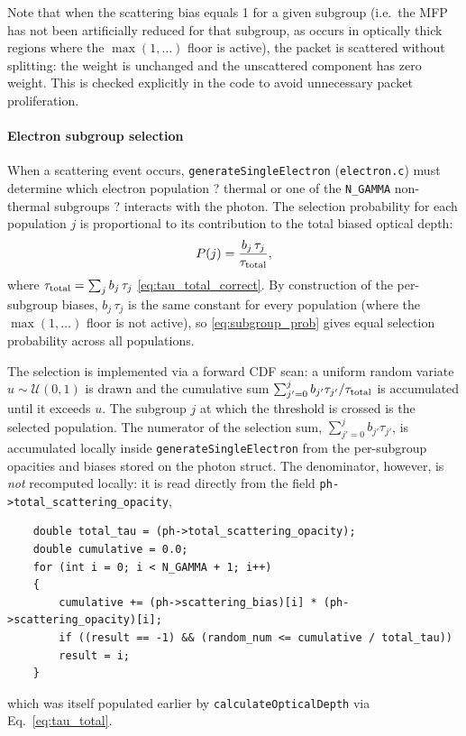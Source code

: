 \documentclass[12pt,a4paper]{article}
\newcommand{\code}[1]{\texttt{#1}}
\begin{document}
Note that when the scattering bias equals 1 for a given subgroup (i.e.\
the MFP has not been artificially reduced for that subgroup, as occurs in
optically thick regions where the $\max(1,\ldots)$ floor is active), the
packet is scattered without splitting: the weight is unchanged and the
unscattered component has zero weight.  This is checked explicitly in
the code to avoid unnecessary packet proliferation.

\paragraph{Electron subgroup selection}
\label{sec:subgroup_select}

When a scattering event occurs, \code{generateSingleElectron}
(\code{electron.c}) must determine which electron population ? thermal or
one of the \code{N\_GAMMA} non-thermal subgroups ? interacts with the
photon.  The selection probability for each population $j$ is proportional
to its contribution to the total biased optical depth:
\begin{equation}
	P(j) = \frac{b_j\,\tau_j}{\tau_{\rm total}},
	\label{eq:subgroup_prob}
\end{equation}
where $\tau_{\rm total} = \sum_j b_j\,\tau_j$ \eqref{eq:tau_total_correct}.
By construction of the per-subgroup biases, $b_j\,\tau_j$ is the same
constant for every population (where the $\max(1,\ldots)$ floor is not
active), so \eqref{eq:subgroup_prob} gives equal selection probability
across all populations.

The selection is implemented via a forward CDF scan: a uniform random
variate $u \sim \mathcal{U}(0,1)$ is drawn and the cumulative sum
$\sum_{j'=0}^{j} b_{j'}\tau_{j'} / \tau_{\rm total}$ is accumulated
until it exceeds $u$.  The subgroup $j$ at which the threshold is crossed
is the selected population.  
The numerator of the selection sum, $\sum_{j'=0}^{j} b_{j'}\tau_{j'}$,
is accumulated locally inside \code{generateSingleElectron} from the
per-subgroup opacities and biases stored on the photon struct. The
denominator, however, is \emph{not} recomputed locally: it is read
directly from the field \code{ph->total\_scattering\_opacity},
\begin{verbatim}
	double total_tau = (ph->total_scattering_opacity);
	double cumulative = 0.0;
	for (int i = 0; i < N_GAMMA + 1; i++)
	{
		cumulative += (ph->scattering_bias)[i] * (ph->scattering_opacity)[i];
		if ((result == -1) && (random_num <= cumulative / total_tau))
		result = i;
	}
\end{verbatim}
which was itself populated earlier by \code{calculateOpticalDepth} via
Eq.~\eqref{eq:tau_total}.
\end{document}
